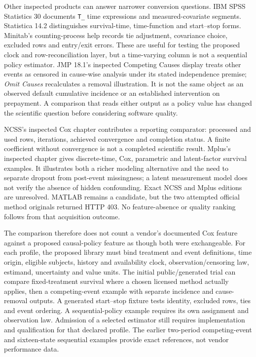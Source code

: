Other inspected products can answer narrower conversion questions. IBM SPSS
Statistics 30 documents \texttt{T\_} time expressions and measured-covariate
segments. Statistica 14.2 distinguishes survival-time, time-function and
start--stop forms. Minitab's counting-process help records tie adjustment,
covariance choice, excluded rows and entry/exit errors. These are useful for
testing the proposed clock and row-reconciliation layer, but a time-varying
column is not a sequential policy estimator. JMP 18.1's inspected
Competing Causes display treats other events as censored in cause-wise
analysis under its stated independence premise; \emph{Omit Causes}
recalculates a removal illustration. It is not the same object as an
observed default cumulative incidence or an established intervention on
prepayment. A comparison that reads either output as a policy value has
changed the scientific question before considering software quality.
\citep{exec14_survival_ibm,exec14_survival_statistica,exec14_survival_minitab,exec14_survival_jmp}

NCSS's inspected Cox chapter contributes a reporting comparator: processed
and used rows, iterations, achieved convergence and completion status. A
finite coefficient without convergence is not a completed scientific result.
Mplus's inspected chapter gives discrete-time, Cox, parametric and latent-factor
survival examples. It illustrates both a richer modeling alternative and the
need to separate dropout from post-event missingness; a latent measurement
model does not verify the absence of hidden confounding. Exact NCSS and Mplus
editions are unresolved. MATLAB remains a candidate, but the two attempted
official method originals returned HTTP 403. No feature-absence or quality
ranking follows from that acquisition outcome.
\citep{exec14_survival_ncss,exec14_survival_mplus,exec16_commercial_matrix}

The comparison therefore does not count a vendor's documented Cox feature
against a proposed causal-policy feature as though both were exchangeable.
For each profile, the proposed library must bind treatment and event
definitions, time origin, eligible subjects, history and availability clock,
observation/censoring law, estimand, uncertainty and value units. The initial
public/generated trial can compare fixed-treatment survival where a chosen
licensed method actually applies, then a competing-event example with separate
incidence and cause-removal outputs. A generated start--stop fixture tests
identity, excluded rows, ties and event ordering. A sequential-policy example
requires its own assignment and observation law. Admission of a selected
estimator still requires implementation and qualification for that declared
profile.
The earlier two-period competing-event and sixteen-state sequential examples
provide exact references, not vendor performance data.
\citep{exec14_survival_exact,exec16_commercial_matrix}

